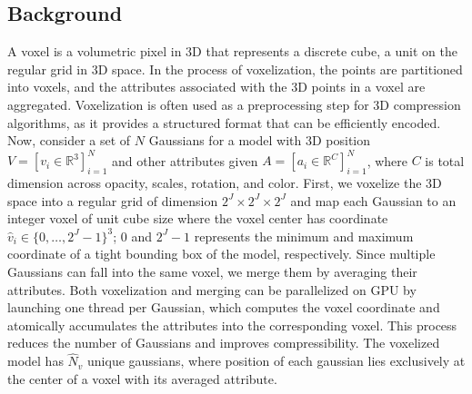 \subsection{Background}\label{sec:background}
A voxel is a volumetric pixel in 3D that represents a discrete cube, a unit on the regular grid in 3D space.
%
In the process of voxelization, the points are partitioned into voxels, and the attributes associated with the 3D points in a voxel are aggregated.
%
Voxelization is often used as a preprocessing step for 3D compression algorithms, as it provides a structured format that can be efficiently encoded.
%
Now, consider a set of $N$ Gaussians for a \gs model with 3D position $V = [v_i \in \mathbb{R}^3]_{i=1}^N$ and other attributes given $A = [a_i \in \mathbb{R}^C]_{i=1}^N$, where $C$ is total dimension across opacity, scales, rotation, and color.
%
First, we voxelize the 3D space into a regular grid of dimension $2^J \times 2^J \times 2^J$ and map each Gaussian to an integer voxel of unit cube size where the voxel center has coordinate $\hat{v}_i \in \{0, \dots, 2^J-1\}^3$; $0$ and $2^J-1$ represents the minimum and maximum coordinate of a tight bounding box of the \gs model, respectively.
%
Since multiple Gaussians can fall into the same voxel, we merge them by averaging their attributes.
%
Both voxelization and merging can be parallelized on GPU by launching one thread per Gaussian, which computes the voxel coordinate and atomically accumulates the attributes into the corresponding voxel.
%
This process reduces the number of Gaussians and improves compressibility. The voxelized \gs model has $\hat{N}_v$ unique gaussians, where position of each gaussian lies exclusively at the center of a voxel with its averaged attribute.


